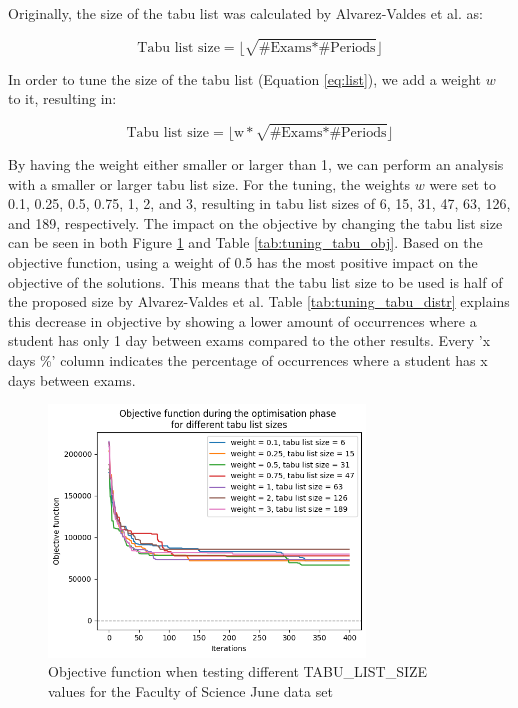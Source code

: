 Originally, the size of the tabu list was calculated by Alvarez-Valdes et al. as:

\begin{equation}
    \text{Tabu list size} = \lfloor \sqrt{\text{\# Exams} * \text{\# Periods}}\rfloor
\end{equation}

In order to tune the size of the tabu list (Equation \ref{eq:list}), we add a weight $w$ to it, resulting in:

\begin{equation}
    \text{Tabu list size} = \lfloor\text{w} * \sqrt{\text{\# Exams} * \text{\# Periods}}\rfloor
\end{equation}

By having the weight either smaller or larger than 1, we can perform an analysis with a smaller or larger tabu list size. For the tuning, the weights $w$ were set to 0.1, 0.25, 0.5, 0.75, 1, 2, and 3, resulting in tabu list sizes of 6, 15, 31, 47, 63, 126, and 189, respectively. The impact on the objective by changing the tabu list size can be seen in both Figure \ref{fig:tuning_tabu} and Table \ref{tab:tuning_tabu_obj}. Based on the objective function, using a weight of 0.5  has the most positive impact on the objective of the solutions. This means that the tabu list size to be used is half of the proposed size by Alvarez-Valdes et al. Table \ref{tab:tuning_tabu_distr} explains this decrease in objective by showing a lower amount of occurrences where a student has only 1 day between exams compared to the other results. Every 'x days \%' column indicates the percentage of occurrences where a student has x days between exams. 

\begin{figure}[H]
	\centering
	\includegraphics[width=0.75\textwidth]{images/tuning/tabu_list.png} 
	\caption{Objective function when testing different TABU\_LIST\_SIZE \\ values for the Faculty of Science June data set}
	\label{fig:tuning_tabu}
\end{figure}

